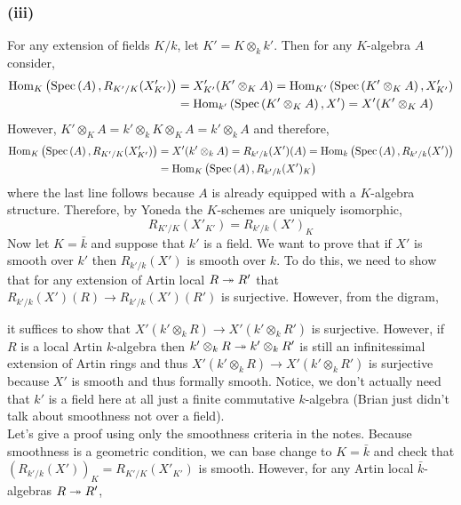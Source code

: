 \documentclass[12pt]{article}
\begin{document}
\subsubsection{(iii)}

For any extension of fields $K/k$, let $K' = K \otimes_k k'$. Then for any $K$-algebra $A$ consider,
\begin{align*}
\mathrm{Hom}_{K} \left( \mathrm{Spec}\left( A \right), R_{K'/K}(X'_{K'}) \right) & = X'_{K'}(K' \otimes_K A) = \mathrm{Hom}_{K'} \left( \mathrm{Spec}\left( K' \otimes_K A \right), X'_{K'} \right) 
\\
& = \mathrm{Hom}_{k'} \left( \mathrm{Spec}\left( K' \otimes_K A \right), X' \right) = X'(K' \otimes_K A)
\end{align*}
However, $K' \otimes_K A = k' \otimes_k K \otimes_K A = k' \otimes_k A$ and therefore,
\begin{align*}
\mathrm{Hom}_{K} \left( \mathrm{Spec}\left( A \right), R_{K'/K}(X'_{K'}) \right) & = X'(k' \otimes_k A) = R_{k'/k}(X')(A) = \mathrm{Hom}_{k} \left( \mathrm{Spec}\left( A \right), R_{k'/k}(X') \right) 
\\
& = \mathrm{Hom}_{K} \left( \mathrm{Spec}\left( A \right), R_{k'/k}(X')_K \right)
\end{align*}
where the last line follows because $A$ is already equipped with a $K$-algebra structure. Therefore, by Yoneda the $K$-schemes are uniquely isomorphic,
\[ R_{K'/K}(X'_{K'}) = R_{k'/k}(X')_K \]
Now let $K = \bar{k}$ and suppose that $k'$ is a field. We want to prove that if $X'$ is smooth over $k'$ then $R_{k'/k}(X')$ is smooth over $k$. To do this, we need to show that for any extension of Artin local  $R \twoheadrightarrow R'$ that $R_{k'/k}(X')(R) \to R_{k'/k}(X')(R')$ is surjective. However, from the digram,
\begin{center}
\end{center}
it suffices to show that $X'(k' \otimes_k R) \to X'(k' \otimes_k R')$ is surjective. However, if $R$ is a local Artin $k$-algebra then $k' \otimes_k R \twoheadrightarrow k' \otimes_k R'$ is still an infinitessimal extension of Artin rings and thus $X'(k' \otimes_k R) \to X'(k' \otimes_k R')$ is surjective because $X'$ is smooth and thus formally smooth. Notice, we don't actually need that $k'$ is a field here at all just a finite commutative $k$-algebra (Brian just didn't talk about smoothness not over a field).
\bigskip\\
Let's give a proof using only the smoothness criteria in the notes. Because smoothness is a geometric condition, we can base change to $K = \bar{k}$ and check that $(R_{k'/k}(X'))_K = R_{K'/K}(X'_{K'})$ is smooth. However, for any Artin local $\bar{k}$-algebras $R \twoheadrightarrow R'$,
\begin{center}
\end{center}
\end{document}
